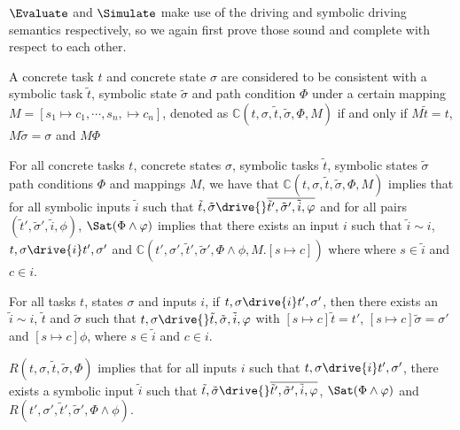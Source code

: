 $\Evaluate$ and $\Simulate$ make use of the driving and symbolic driving semantics respectively, so we again first prove those sound and complete with respect to each other.


\begin{definition}
A concrete task $t$ and concrete state $\sigma$
are considered to be consistent with a symbolic task $\tilde{t}$, symbolic state $\tilde{\sigma}$ and path condition $\Phi$
under a certain mapping $M=[s_1\mapsto c_1,\cdots,s_n,\mapsto c_n]$, denoted as $\mathds{C}(t,\sigma,\tilde{t},\tilde{\sigma},\Phi,M)$
if and only if $M\tilde{t}=t$, $M\tilde{\sigma}=\sigma$ and $M\Phi$
\end{definition}

\begin{lemma}
  \label{lem:sounddriving}
  For all concrete tasks $t$, concrete states $\sigma$, symbolic tasks $\tilde{t}$, symbolic states $\tilde{\sigma}$ path conditions $\Phi$ and mappings $M$,
  we have that $\mathds{C}(t,\sigma,\tilde{t},\tilde{\sigma},\Phi,M)$ implies
  that for all symbolic inputs $\tilde{i}$ such that $\tilde{t},\tilde{\sigma}\drive{}\overline{\tilde{t}',\tilde{\sigma}',\tilde{i},\phi}$ and
  for all pairs $(\tilde{t}',\tilde{\sigma}',\tilde{i},\phi)$,
  $\Sat(\Phi\land\phi)$ implies that there exists an input $i$ such that $\tilde{i}\sim i$,  $t,\sigma\drive{i}t',\sigma'$ and $\mathds{C}(t',\sigma',\tilde{t}',\tilde{\sigma}',\Phi\land\phi,M.[s\mapsto c])$ where where $s\in\tilde{i}$ and $c\in i$.
\end{lemma}

\begin{lemma}
  \label{lem:completedriving}
  For all tasks $t$, states $\sigma$ and inputs $i$,
  if $t,\sigma\drive{i}t',\sigma'$,
  then there exists an $\tilde{i}\sim i$, $\tilde{t}$ and $\tilde{\sigma}$
  such that $t,\sigma\drive{}\tilde{t},\tilde{\sigma},\tilde{i},\phi$
  with $[s\mapsto c]\tilde{t}=t'$, $[s\mapsto c]\tilde{\sigma}=\sigma'$ and $[s\mapsto c]\phi$, where $s\in \tilde{i}$ and $c\in i$.


  $R(t,\sigma,\tilde{t},\tilde{\sigma},\Phi)$ implies
  that for all inputs $i$ such that $t,\sigma\drive{i}t',\sigma'$,
  there exists a symbolic input $\tilde{i}$ such that $\tilde{t},\tilde{\sigma}\drive{}\overline{\tilde{t}',\tilde{\sigma}',\tilde{i},\phi}$, $\Sat(\Phi\land\phi)$ and $R(t',\sigma',\tilde{t}',\tilde{\sigma}',\Phi\land\phi)$.
\end{lemma}

